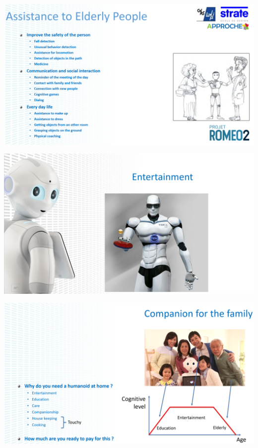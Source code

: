 \documentclass[xetex,mathserif,serif]{beamer}
\begin{document}
	\begin{frame}
		\begin{center}
			\includegraphics[width=\textwidth]{gelin7.png}
		\end{center}
	\end{frame}

	\begin{frame}
		\begin{center}
			\includegraphics[width=\textwidth]{gelin8.png}
		\end{center}
	\end{frame}

	\begin{frame}
		\begin{center}
			\includegraphics[width=\textwidth]{gelin9.png}
		\end{center}
	\end{frame}
\end{document}
